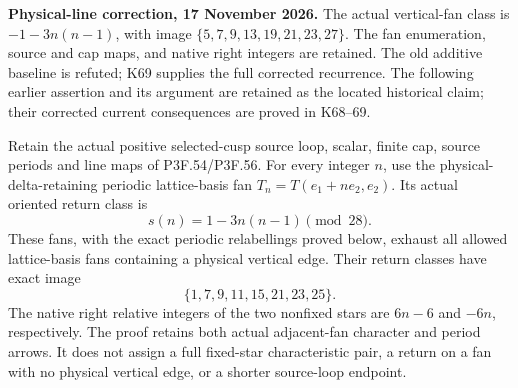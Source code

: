 \begin{theorem}\label{night:P3K.56}
\par\noindent\textbf{Physical-line correction, 17 November 2026.} The actual vertical-fan class is \(-1-3n(n-1)\), with image \(\{5,7,9,13,19,21,23,27\}\). The fan enumeration, source and cap maps, and native right integers are retained. The old additive baseline is refuted; K69 supplies the full corrected recurrence. The following earlier assertion and its argument are retained as the located historical claim; their corrected current consequences are proved in K68--69.\medskip\par 
Retain the actual positive selected-cusp source loop, scalar, finite
cap, source periods and line maps of P3F.54/P3F.56. For every integer
\(n\), use the physical-delta-retaining periodic lattice-basis fan
\(T_n=T(e_1+ne_2,e_2)\). Its actual oriented return class is
\[
                  s(n)=1-3n(n-1)\pmod{28}.
\]
These fans, with the exact periodic relabellings proved below,
exhaust all allowed lattice-basis fans containing a physical vertical
edge. Their return classes have exact image
\[
                     \{1,7,9,11,15,21,23,25\}.
\]
The native right relative integers of the two nonfixed stars are
\(6n-6\) and \(-6n\), respectively. The proof retains both actual
adjacent-fan character and period arrows. It does not assign a full
fixed-star characteristic pair, a return on a fan with no physical
vertical edge, or a shorter source-loop endpoint.
\end{theorem}
